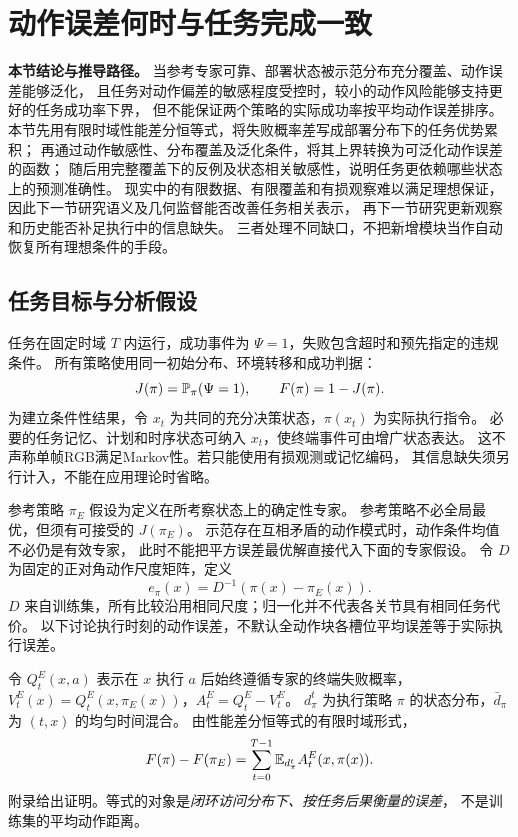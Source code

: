 \section{动作误差何时与任务完成一致}
\noindent\textbf{本节结论与推导路径。}
当参考专家可靠、部署状态被示范分布充分覆盖、动作误差能够泛化，
且任务对动作偏差的敏感程度受控时，较小的动作风险能够支持更好的任务成功率下界，
但不能保证两个策略的实际成功率按平均动作误差排序。
本节先用有限时域性能差分恒等式，将失败概率差写成部署分布下的任务优势累积；
再通过动作敏感性、分布覆盖及泛化条件，将其上界转换为可泛化动作误差的函数；
随后用完整覆盖下的反例及状态相关敏感性，说明任务更依赖哪些状态上的预测准确性。
现实中的有限数据、有限覆盖和有损观察难以满足理想保证，
因此下一节研究语义及几何监督能否改善任务相关表示，
再下一节研究更新观察和历史能否补足执行中的信息缺失。
三者处理不同缺口，不把新增模块当作自动恢复所有理想条件的手段。

\subsection{任务目标与分析假设}
任务在固定时域 $T$ 内运行，成功事件为 $\Psi=1$，失败包含超时和预先指定的违规条件。
所有策略使用同一初始分布、环境转移和成功判据：
\begin{equation}
 J(\pi)=\mathbb P_\pi(\Psi=1),\qquad F(\pi)=1-J(\pi).
 \label{eq:success}
\end{equation}
为建立条件性结果，令 $x_t$ 为共同的充分决策状态，$\pi(x_t)$ 为实际执行指令。
必要的任务记忆、计划和时序状态可纳入 $x_t$，使终端事件可由增广状态表达。
这不声称单帧RGB满足Markov性。若只能使用有损观测或记忆编码，
其信息缺失须另行计入，不能在应用理论时省略。

参考策略 $\pi_E$ 假设为定义在所考察状态上的确定性专家。
参考策略不必全局最优，但须有可接受的 $J(\pi_E)$。
示范存在互相矛盾的动作模式时，动作条件均值不必仍是有效专家，
此时不能把平方误差最优解直接代入下面的专家假设。
令 $D$ 为固定的正对角动作尺度矩阵，定义
\begin{equation}
 e_\pi(x)=D^{-1}(\pi(x)-\pi_E(x)).
\end{equation}
$D$ 来自训练集，所有比较沿用相同尺度；归一化并不代表各关节具有相同任务代价。
以下讨论执行时刻的动作误差，不默认全动作块各槽位平均误差等于实际执行误差。

令 $Q_t^E(x,a)$ 表示在 $x$ 执行 $a$ 后始终遵循专家的终端失败概率，
$V_t^E(x)=Q_t^E(x,\pi_E(x))$，$A_t^E=Q_t^E-V_t^E$。
$d_\pi^t$ 为执行策略 $\pi$ 的状态分布，$\bar d_\pi$ 为 $(t,x)$ 的均匀时间混合。
由性能差分恒等式的有限时域形式，
\begin{equation}
 F(\pi)-F(\pi_E)
 =\sum_{t=0}^{T-1}\mathbb E_{d_\pi^t} A_t^E(x,\pi(x)).
 \label{eq:pd}
\end{equation}
附录给出证明。等式的对象是\emph{闭环访问分布下、按任务后果衡量的误差}，
不是训练集的平均动作距离。

